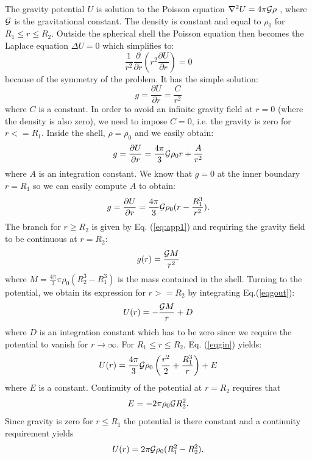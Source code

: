 The gravity potential $U$ is solution to the Poisson equation 
${\mathbf \nabla}^2 U = 4\pi {\cal G} \rho$ \cite{TS14}, where ${\cal G}$ is the gravitational constant.
The density is constant and equal to $\rho_0$ for $R_1\leq r \leq R_2$.
Outside the spherical shell the Poisson equation then becomes the Laplace equation $\Delta U=0$ which simplifies to: 
\begin{equation}
\frac{1}{r^2} \frac{\partial }{\partial r} \left(r^2 \frac{\partial U}{\partial r} \right) = 0 
\end{equation}
because of the symmetry of the problem. It has the simple solution:
\begin{equation}
g=\frac{\partial U}{\partial r} = \frac{C}{r^2} \label{eq:app1}
\end{equation}
where $C$ is a constant.
In order to avoid an infinite gravity field at $r=0$ (where the density is also zero), we need to impose $C=0$, i.e. the 
gravity is zero for $r<=R_1$.
Inside the shell, $\rho=\rho_0$ and we easily obtain:
\begin{equation}
g=\frac{\partial U}{\partial r} = \frac{4 \pi}{3} {\cal G} \rho_0 r + \frac{A}{r^2}
\end{equation}
where $A$ is an integration constant. 
We know that $g=0$ at the inner boundary $r=R_1$ so we can easily compute $A$ to obtain:
\begin{equation}
g=\frac{\partial U}{\partial r} = \frac{4 \pi}{3} {\cal G} \rho_0 (r - \frac{R_1^3}{r^2}). \label{eqgin}
\end{equation}
The branch for $r\geq R_2$ is given by Eq. (\ref{eq:app1}) and requiring the gravity field to be continuous at $r=R_2$:
\begin{equation}
g(r) = \frac{{\cal G} M}{r^2} \label{eqgout}
\end{equation}
where $M=\frac{4\pi}{3}\pi\rho_0(R_2^3-R_1^3)$ is the mass contained in the shell.
Turning to the potential, we obtain its expression for $r>=R_2$ by integrating Eq.(\ref{eqgout}):
\begin{equation}
U(r)=-\frac{{\cal G}M}{r} +D
\end{equation}
where $D$ is an integration constant which has to be zero since we require the potential to vanish for $r\rightarrow \infty$.
For $R_1\leq r \leq R_2$, Eq. (\ref{eqgin}) yields:
\begin{equation}
U(r)= \frac{4 \pi}{3} {\cal G} \rho_0 \left(\frac{r^2}{2} + \frac{R_1^3}{r} \right)  + E 
\end{equation}
where $E$ is a constant. Continuity of the potential at $r=R_2$ requires that
\begin{equation}
E=-2\pi\rho_0 {\cal G}R_2^2.
\end{equation}
Since gravity is zero for $r\leq R_1$ the potential is there constant and a continuity requirement yields
\begin{equation}
U(r)=2\pi {\cal G}\rho_0 (R_1^2-R_2^2).
\end{equation}

